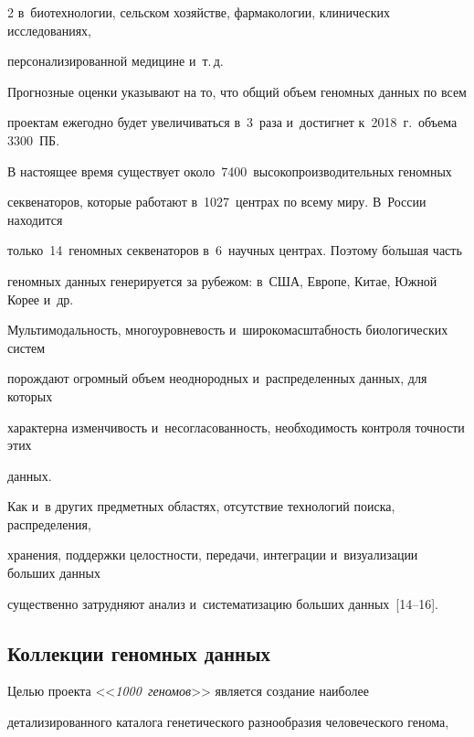 \begin{multicols}{2}
в~биотехнологии, сельском хозяйстве, фармакологии, клинических исследованиях, 


персонализированной медицине и~т.\,д.


  


  Прогнозные оценки указывают на то, что общий объем геномных данных по всем 


проектам ежегодно будет увеличиваться в~3~раза и~достигнет к~2018~г.\ объема 3300~ПБ.


  


  В настоящее время существует около~7400~высокопроизводительных геномных 


секвенаторов, которые работают в~1027~центрах по всему миру. В~России находится 


только~14~геномных секвенаторов в~6~научных центрах. Поэтому б$\acute{\mbox{о}}$льшая часть 


геномных данных генерируется за рубежом: в~США, Европе, Китае, Южной Корее и~др. 


  


  Мультимодальность, многоуровневость и~широкомасштабность биологических систем 


порождают огромный объем неоднородных и~распределенных данных, для которых 


характерна изменчивость и~несогласованность, необходимость контроля точности этих 


данных. 


  


  Как и~в других предметных областях, отсутствие технологий поиска, распределения, 


хранения, поддержки целостности, передачи, интеграции и~визуализации больших данных 


существенно затрудняют анализ и~систематизацию больших данных~[14--16].





\subsection{Коллекции геномных данных}


  


  Целью проекта <<\textit{1000~геномов}>> является создание наиболее 


детализированного каталога генетического разнообразия человеческого генома, 



\end{multicols}
